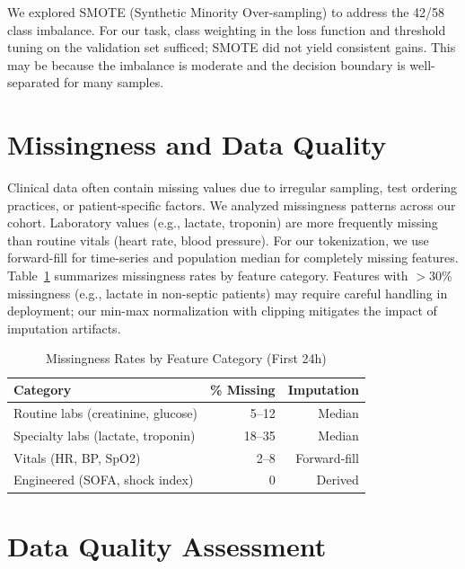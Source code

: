 We explored SMOTE (Synthetic Minority Over-sampling) to address the 42/58 class imbalance. For our task, class weighting in the loss function and threshold tuning on the validation set sufficed; SMOTE did not yield consistent gains. This may be because the imbalance is moderate and the decision boundary is well-separated for many samples.

\section{Missingness and Data Quality}

Clinical data often contain missing values due to irregular sampling, test ordering practices, or patient-specific factors. We analyzed missingness patterns across our cohort. Laboratory values (e.g., lactate, troponin) are more frequently missing than routine vitals (heart rate, blood pressure). For our tokenization, we use forward-fill for time-series and population median for completely missing features. Table~\ref{tab:missingness} summarizes missingness rates by feature category. Features with $>$30\% missingness (e.g., lactate in non-septic patients) may require careful handling in deployment; our min-max normalization with clipping mitigates the impact of imputation artifacts.

\begin{table}[htbp]
\centering
\caption{Missingness Rates by Feature Category (First 24h)}
\begin{tabular}{lrr}
\toprule
Category & \% Missing & Imputation \\
\midrule
Routine labs (creatinine, glucose) & 5--12 & Median \\
Specialty labs (lactate, troponin) & 18--35 & Median \\
Vitals (HR, BP, SpO2) & 2--8 & Forward-fill \\
Engineered (SOFA, shock index) & 0 & Derived \\
\bottomrule
\end{tabular}
\label{tab:missingness}
\end{table}

\section{Data Quality Assessment}

